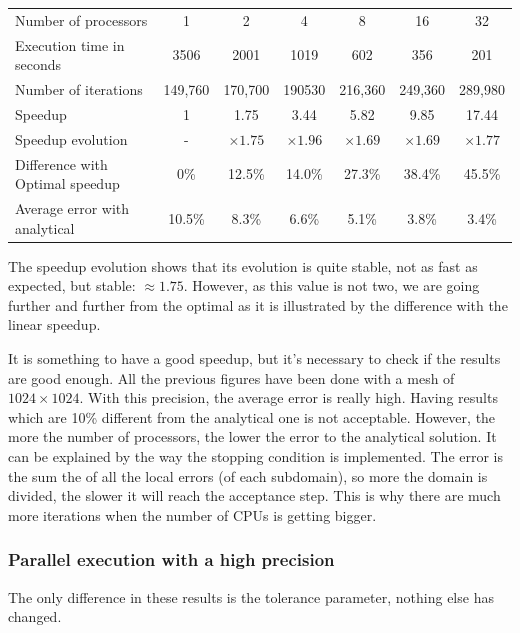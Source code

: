 \documentclass[a4paper,11pt]{article}
\begin{document}
\vspace{2em}
\hspace{-5em}
\begin{tabular}{l | c | c | c | c | c | c}
Number of processors & 1 & 2 & 4 & 8 & 16 & 32 \\
Execution time in seconds & 3506 & 2001 & 1019 & 602 & 356 & 201 \\
Number of iterations & 149,760 & 170,700 & 190530 & 216,360 & 249,360 & 289,980 \\
Speedup & 1 & 1.75 & 3.44 & 5.82 & 9.85 & 17.44 \\
Speedup evolution & - & $\times1.75$ & $\times1.96$ & $\times1.69$ & $\times1.69$  & $\times1.77$ \\
Difference with Optimal speedup & 0\% & 12.5\% & 14.0\% & 27.3\% & 38.4\% & 45.5\% \\
Average error with analytical & 10.5\% & 8.3\% & 6.6\% & 5.1\% & 3.8\% & 3.4\%
\end{tabular}
\vspace{1em}

The speedup evolution shows that its evolution is quite stable, not as fast as expected, but stable: $\approx 1.75$. However,
as this value is not two, we are going further and further from the optimal as it is illustrated by the difference with the linear speedup.

It is something to have a good speedup, but it's necessary to check if the results are good enough. All the previous figures have been done
with a mesh of $1024 \times 1024$. With this precision, the average error is really high. Having results which are 10\% different from the
analytical one is not acceptable. However, the more the number of processors, the lower the error to the analytical solution.
It can be explained by the way the stopping condition is implemented. The error is the sum the of all the local errors (of each subdomain),
so more the domain is divided, the slower it will reach the acceptance step. This is why there are much more iterations when the number of CPUs is getting bigger. 

\subsubsection{Parallel execution with a high precision}

The only difference in these results is the tolerance parameter, nothing else has changed.
\end{document}
